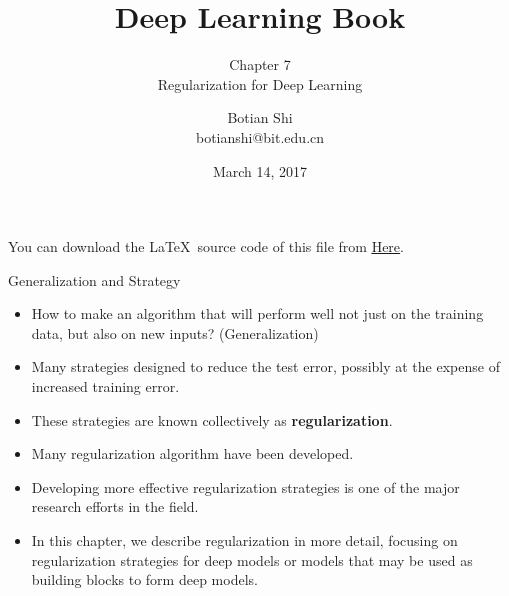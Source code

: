 \documentclass[10pt]{beamer}
\begin{document}
	\title{Deep Learning Book}
	\subtitle{Chapter 7 \\ Regularization for Deep Learning}
	\author{Botian Shi \\ botianshi@bit.edu.cn}
	\date{March 14, 2017}
	
	
	\begin{frame}[plain]
		\titlepage
	\end{frame}
	
	\begin{frame}
		You can download the \LaTeX\, source code of this file from \href{https://github.com/friskit-china/DLBookSlides}{\underline{Here}}.
	\end{frame}
	
	\begin{frame}{Generalization and Strategy}
		\begin{itemize}
			\item How to make an algorithm that will perform well not just on the training data, but also on new inputs? (Generalization)
			\pause
			\item Many strategies designed to reduce the test error, possibly at the expense of increased training error.
			\pause
			\item These strategies are known collectively as \textbf{regularization}.
			\pause
			\item Many regularization algorithm have been developed.
			\pause
			\item Developing more effective regularization strategies is one of the major research efforts in the field.
			\pause
			\item In this chapter, we describe regularization in more detail, focusing on regularization strategies for deep models or models that may be used as building blocks to form deep models.
		\end{itemize}
	\end{frame}
	
\end{document}
